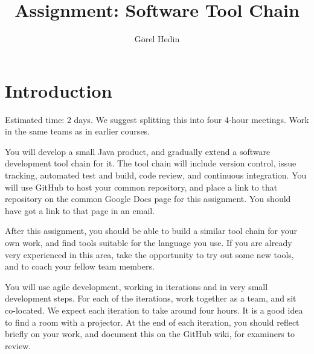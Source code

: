 \documentclass[swedish,english]{article}
\author{G{\"o}rel Hedin}
\title{Assignment: Software Tool Chain}
\begin{document}
\maketitle[]

\section*{Introduction}

Estimated time: 2 days. We suggest splitting this into four 4-hour meetings.
Work in the same teams as in earlier courses.

You will develop a small Java product, and gradually extend a software development tool chain for it. The tool chain will include version control, issue tracking, automated test and build, code review, and continuous integration. You will use GitHub to host your common repository, and place a link to that repository on the common Google Docs page for this assignment. You should have got a link to that page in an email.

After this assignment, you should be able to build a similar tool chain for your own work, and find tools suitable for the language you use. If you are already very experienced in this area, take the opportunity to try out some new tools, and to coach your fellow team members. 

You will use agile development, working in iterations and in very small development steps.
For each of the iterations, work together as a team, and sit co-located. We expect each iteration to take around four hours. It is a good idea to find a room with a projector. At the end of each iteration, you should reflect briefly on your work, and document this on the GitHub wiki, for examiners to review. 
\end{document}
